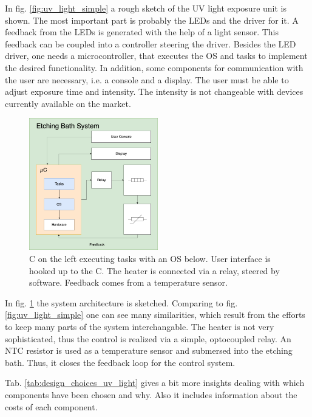 In fig. \ref{fig:uv_light_simple} a rough sketch of the \gls{UV} light exposure unit is shown. The most important part is probably the \glspl{LED} and the driver for it. A feedback from the \glspl{LED} is generated with the help of a light sensor. This feedback can be coupled into a controller steering the driver. Besides the \gls{LED} driver, one needs a microcontroller, that executes the \gls{OS} and tasks to implement the desired functionality. In addition, some components for communication with the user are necessary, i.e. a console and a display. The user must be able to adjust exposure time and intensity. The intensity is not changeable with devices currently available on the market. 

\begin{figure}[H]                                                         
\centering          
\includegraphics[width=0.5\textwidth]{./fig/etching_bath_simple}   
\caption[\mu C with user interface, heater and feedback loop.]{\mu C on the left executing tasks with an OS below. User interface is hooked up to the \mu C. The heater is connected via a relay, steered by software. Feedback comes from a temperature sensor.}   
\label{fig:etching_bath_simple}
\end{figure} 

In fig. \ref{fig:etching_bath_simple} the system architecture is sketched. Comparing to fig. \ref{fig:uv_light_simple} one can see many similarities, which result from the efforts to keep many parts of the system interchangable. The heater is not very sophisticated, thus the control is realized via a simple, optocoupled relay. An \gls{NTC} resistor is used as a temperature sensor and submersed into the etching bath. Thus, it closes the feedback loop for the control system.

Tab. \ref{tab:design_choices_uv_light} gives a bit more insights dealing with which components have been chosen and why. Also it includes information about the costs of each component. 

